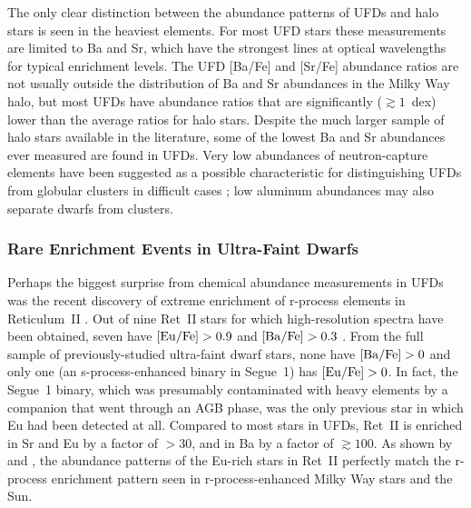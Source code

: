 \documentclass[a4paper]{ar-1col}
\begin{document}
The only clear distinction between the abundance patterns of UFDs and
halo stars is seen in the heaviest elements.  For most UFD stars these
measurements are limited to Ba and Sr, which have the strongest lines
at optical wavelengths for typical enrichment levels.  The UFD [Ba/Fe]
and [Sr/Fe] abundance ratios are not usually outside the distribution
of Ba and Sr abundances in the Milky Way halo, but most UFDs have
abundance ratios that are significantly ($\gtrsim1$~dex) lower than
the average ratios for halo stars.  Despite the much larger sample of
halo stars available in the literature, some of the lowest Ba and Sr
abundances ever measured are found in UFDs.  Very low abundances of
neutron-capture elements have been suggested as a possible
characteristic for distinguishing UFDs from globular clusters in
difficult cases \citep{ji18}; low aluminum abundances may also
separate dwarfs from clusters.


\subsubsection{Rare Enrichment Events in Ultra-Faint Dwarfs}

Perhaps the biggest surprise from chemical abundance measurements in
UFDs was the recent discovery of extreme enrichment of r-process
elements in Reticulum~II \citep{ji16,roederer16}.  Out of nine Ret~II
stars for which high-resolution spectra have been obtained, seven have
${\rm [Eu/Fe]} > 0.9$ and ${\rm [Ba/Fe]} > 0.3$ \citep{ji16}.  From
the full sample of previously-studied ultra-faint dwarf stars, none
have ${\rm [Ba/Fe]} > 0$ and only one (an s-process-enhanced binary in
Segue~1) has ${\rm [Eu/Fe]} > 0$.  In fact, the Segue~1 binary, which
was presumably contaminated with heavy elements by a companion that
went through an AGB phase, was the only previous star in which Eu had
been detected at all.  Compared to most stars in UFDs, Ret~II is
enriched in Sr and Eu by a factor of $>30$, and in Ba by a factor of
$\gtrsim100$.  As shown by \citet{ji16,ji16c} and \citet{roederer16},
the abundance patterns of the Eu-rich stars in Ret~II perfectly match
the r-process enrichment pattern seen in r-process-enhanced Milky Way
stars and the Sun.
\end{document}
